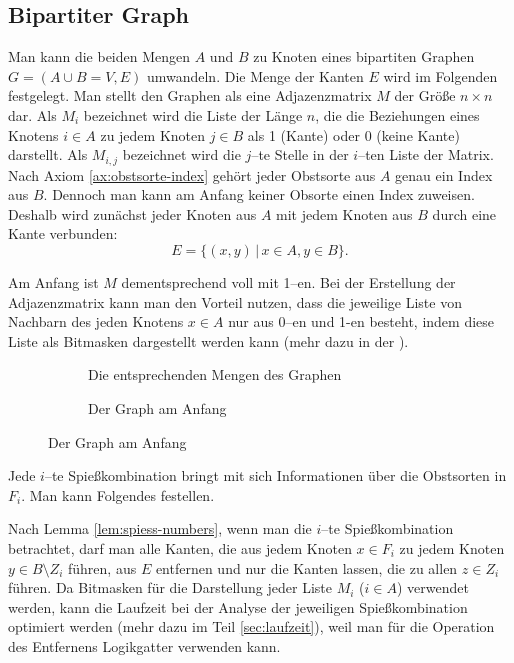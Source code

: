 \subsection{Bipartiter Graph}
Man kann die beiden Mengen $A$ und $B$ zu Knoten eines bipartiten Graphen $G = (A \cup B = V, E)$ umwandeln.
Die Menge der Kanten $E$ wird im Folgenden festgelegt.
Man stellt den Graphen als eine Adjazenzmatrix $M$ der Größe $n \times n$ dar. 
Als $M_i$ bezeichnet wird die Liste der Länge $n$,
die die Beziehungen eines Knotens
$i \in A$ zu jedem Knoten $j \in B$ als 1 (Kante) oder 0 (keine Kante) darstellt.
Als $M_{i, j}$ bezeichnet wird die $j$--te Stelle in der $i$--ten Liste der Matrix.\\
Nach Axiom \ref{ax:obstsorte-index} gehört jeder Obstsorte aus $A$ genau ein Index aus $B$.
Dennoch man kann am Anfang keiner Obsorte einen Index zuweisen.
Deshalb wird zunächst jeder Knoten aus $A$ mit jedem Knoten aus $B$ durch eine Kante verbunden:
\[
E = \{(x, y) \,|\,  x \in A, y \in B\}.
\]

Am Anfang ist $M$ dementsprechend voll mit 1--en.
Bei der Erstellung der Adjazenzmatrix kann man den Vorteil nutzen, dass die jeweilige 
Liste von Nachbarn des jeden Knotens $x \in A$ nur aus 0--en und 1-en besteht, indem
 diese Liste als Bitmasken dargestellt werden kann (mehr dazu in der ).

\begin{figure}[H]
\centering
\caption{Beide Abbildungen stellen den Graphen für das Beispiel aus der Aufgabenstellung dar.\\
Die Buchstaben stehen für die entsprechenden Obstsorten aus diesem Beispiel (s. auch \ref{example:0}).}
\begin{subfigure}[b]{.49\textwidth}
\centering

\caption{Die entsprechenden Mengen des Graphen}
\label{fig:graph-anfang}
\end{subfigure}
\begin{subfigure}[b]{.49\textwidth}
\centering

\caption{Der Graph am Anfang}
\label{fig:graph-full}
\end{subfigure}
\end{figure}

Jede $i$--te Spießkombination bringt mit sich Informationen über die Obstsorten in $F_i$.
Man kann Folgendes festellen. 



Nach Lemma \ref{lem:spiess-numbers}, wenn man die $i$--te Spießkombination betrachtet,
 darf man alle Kanten, die aus jedem Knoten $x \in F_i$ 
zu jedem Knoten $y \in B \setminus Z_i$ führen, aus $E$ entfernen und nur die Kanten lassen, die
zu allen $z \in Z_i$ führen.
Da Bitmasken für die Darstellung jeder Liste $M_i$ ($i \in A$) verwendet werden, kann
die Laufzeit bei der Analyse der jeweiligen Spießkombination optimiert werden
(mehr dazu im Teil \ref{sec:laufzeit}),
weil man für die Operation des Entfernens Logikgatter verwenden kann.
